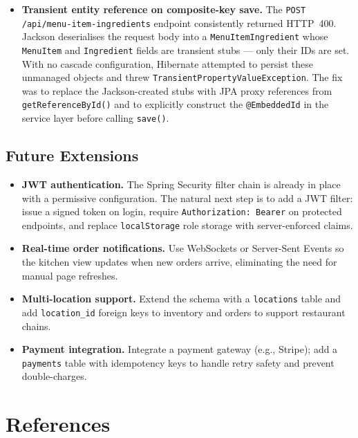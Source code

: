 \documentclass[12pt,a4paper]{article}
\begin{document}
\begin{itemize}
    \item \textbf{Transient entity reference on composite-key save.}
          The \texttt{POST /api/menu-item-ingredients} endpoint consistently
          returned HTTP~400. Jackson deserialises the request body into a
          \texttt{MenuItemIngredient} whose \texttt{MenuItem} and
          \texttt{Ingredient} fields are transient stubs --- only their IDs are
          set. With no cascade configuration, Hibernate attempted to persist
          these unmanaged objects and threw
          \texttt{TransientPropertyValueException}. The fix was to replace the
          Jackson-created stubs with JPA proxy references from
          \texttt{getReferenceById()} and to explicitly construct the
          \texttt{@EmbeddedId} in the service layer before calling
          \texttt{save()}.
\end{itemize}

\subsection{Future Extensions}

\begin{itemize}
    \item \textbf{JWT authentication.} The Spring Security filter chain is
          already in place with a permissive configuration. The natural next
          step is to add a JWT filter: issue a signed token on login, require
          \texttt{Authorization: Bearer} on protected endpoints, and replace
          \texttt{localStorage} role storage with server-enforced claims.
    \item \textbf{Real-time order notifications.} Use WebSockets or
          Server-Sent Events so the kitchen view updates when new orders arrive,
          eliminating the need for manual page refreshes.
    \item \textbf{Multi-location support.} Extend the schema with a
          \texttt{locations} table and add \texttt{location\_id} foreign keys
          to inventory and orders to support restaurant chains.
    \item \textbf{Payment integration.} Integrate a payment gateway (e.g.,
          Stripe); add a \texttt{payments} table with idempotency keys to
          handle retry safety and prevent double-charges.
\end{itemize}

\section{References}
\end{document}

